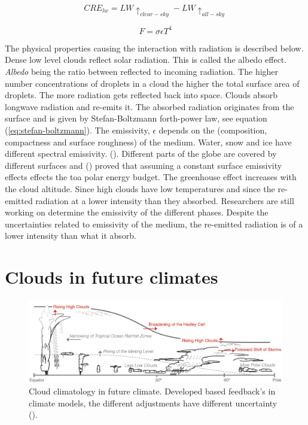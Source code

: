 \begin{equation} \label{eq:cre_lw}
    CRE_{lw} = LW\uparrow_{clear-sky} - LW\uparrow_{all-sky}
\end{equation}

\begin{equation} \label{eq:stefan-boltzmann}
    F = \sigma \epsilon T ^4
\end{equation}

The physical properties causing the interaction with radiation is described below. Dense low level clouds reflect solar radiation. This is called the albedo effect. \textit{Albedo} being the ratio between reflected to incoming radiation. The higher number concentrations of droplets in a cloud the higher the total surface area of droplets. The more radiation gets reflected back into space. Clouds absorb longwave radiation and re-emits it. The absorbed radiation originates from the surface and is given by Stefan-Boltzmann forth-power law, see equation (\ref{eq:stefan-boltzmann}). The emissivity, $\epsilon$ depends on the (composition, compactness and surface roughness) of the medium. Water, snow and ice have different spectral emissivity. (\cite{Huang2018ImprovedClimate}). Different parts of the globe are covered by different surfaces and (\cite{Huang2016AnSimulations}) proved that assuming a constant surface emissivity effects effects the \acrshort{toa} polar energy budget. The greenhouse effect increases with the cloud altitude. Since high clouds have low temperatures and since the re-emitted radiation at a lower intensity than they absorbed. Researchers are still working on determine the emissivity of the different phases. Despite the uncertainties related to emissivity of the medium, the re-emitted radiation is of a lower intensity than what it absorb.

\section{Clouds in future climates} \label{sec:intro_cloud_future_climates}
\begin{figure}[h]
    \centering
    \includegraphics[scale = 0.8]{Chapter1_Intro/images/Fig7-11_ipcc.jpg}
    \caption{Cloud climatology in future climate. Developed based feedback's in climate models, the different adjustments have different uncertainty (\cite{IPCC_CH7_clouds}).}
    \label{fig:cloud_scheme}
\end{figure}

